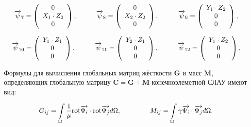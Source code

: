 \begin{equation*}
	\overrightarrow{\psi}_7 = \left(
	\begin{array}{c}
		0\\
		X_1 \cdot Z_2\\
		0\\
	\end{array}
	\right),
	\hspace{10mm}
	\overrightarrow{\psi}_8 = \left(
	\begin{array}{c}
		0\\
		X_2 \cdot Z_2\\
		0\\
	\end{array}
	\right),
	\hspace{10mm}
	\overrightarrow{\psi}_9 = \left(
	\begin{array}{c}
		Y_1 \cdot Z_2\\
		0\\
		0\\
	\end{array}
	\right),
\end{equation*}

\begin{equation*}
	\overrightarrow{\psi}_{10} = \left(
	\begin{array}{c}
		Y_1 \cdot Z_1\\
		0\\
		0\\
	\end{array}
	\right),
	\hspace{10mm}
	\overrightarrow{\psi}_{11} = \left(
	\begin{array}{c}
		Y_2 \cdot Z_1\\
		0\\
		0\\
	\end{array}
	\right),
	\hspace{10mm}
	\overrightarrow{\psi}_{12} = \left(
	\begin{array}{c}
		Y_1 \cdot Z_2\\
		0\\
		0\\
	\end{array}
	\right),
\end{equation*}

Формулы для вычисления глобальных матриц жёсткости $\textbf{G}$ и масс $\textbf{M}$, определяющих глобальную матрицу $\textbf{C} = \textbf{G} + \textbf{M}$ конечноэлеметной СЛАУ имеют вид:

\begin{equation} \label{eq_1_15}
	G_{ij} = \int \limits_{\Omega} \frac{1}{\mu} \text{rot} \overrightarrow{\textbf{$\Psi_i$}} \cdot \text{rot} \overrightarrow{\textbf{$\Psi_j$}} d \Omega, \hspace{15mm} M_{ij} = \int \limits_{\Omega} \gamma \overrightarrow{\textbf{$\Psi_i$}} \cdot \overrightarrow{\textbf{$\Psi_j$}} d \Omega.
\end{equation}


